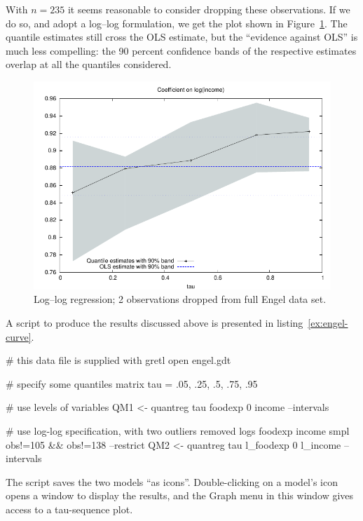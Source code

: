 With $n = 235$ it seems reasonable to consider dropping these
observations.  If we do so, and adopt a log--log formulation, we get
the plot shown in Figure~\ref{fig:tau2}.  The quantile estimates still
cross the OLS estimate, but the ``evidence against OLS'' is much less
compelling: the 90 percent confidence bands of the respective
estimates overlap at all the quantiles considered.

\begin{figure}
  \centering
  \includegraphics{figures/tau-sequence2}
  \caption{Log--log regression; 2 observations dropped from full Engel data
    set.}
  \label{fig:tau2}
\end{figure}

A script to produce the results discussed above is presented in
listing~\ref{ex:engel-curve}.

\begin{script}[htbp]
\begin{scodebit}
# this data file is supplied with gretl
open engel.gdt

# specify some quantiles
matrix tau = {.05, .25, .5, .75, .95}

# use levels of variables
QM1 <- quantreg tau foodexp 0 income --intervals

# use log-log specification, with two outliers removed
logs foodexp income
smpl obs!=105 && obs!=138 --restrict
QM2 <- quantreg tau l_foodexp 0 l_income --intervals
\end{scodebit}
  The script saves the two models ``as icons''. Double-clicking on a
  model's icon opens a window to display the results, and the Graph
  menu in this window gives access to a tau-sequence plot.
\end{script}

